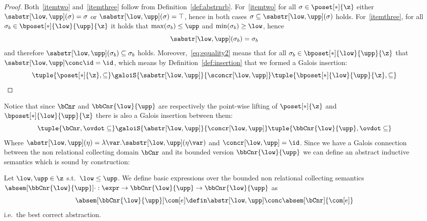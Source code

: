 \begin{proof}
  \noindent
  Both~\ref{itemtwo} and~\ref{itemthree} follow from
  Definition~\ref{def:abstrnrb}. For~\ref{itemtwo} for all
  \(\sigma \in \poset[*]{\z}\) either
  \(\sabstr[\low,\upp]({\sigma}) = \sigma\) or
  \(\sabstr[\low,\upp]({\sigma}) = \top\), hence in both cases
  \(\sigma \subseteq \sabstr[\low,\upp]({\sigma})\)
  holds. For~\ref{itemthree}, for all
  \(\sigma_b \in \bposet[*]{\low}{\upp}{\z}\) it holds that
  \(\max(\sigma_b) \leq \upp\) and \(\min(\sigma_b) \geq \low\), hence
  \begin{equation}\label{eq:equality2}
    \sabstr[\low,\upp]({\sigma_b}) = \sigma_b
  \end{equation}
  and therefore \(\sabstr[\low,\upp]({\sigma_b}) \subseteq \sigma_b\)
  holds.  Moreover,~\eqref{eq:equality2} means that for all
  \(\sigma_b \in \bposet[*]{\low}{\upp}{\z}\) that
  \(\sabstr[\low,\upp] \conc \id = \id\), which means by
  Definition~\ref{def:insertion} that we formed a Galois insertion:
  \begin{equation*}
    \tuple{\poset[*]{\z}, \subseteq}
    \galoiS{\sabstr[\low,\upp]}{\sconcr[\low,\upp]}
    \tuple{\bposet[*]{\low}{\upp}{\z}, \subseteq}
    \qedhere
  \end{equation*}
\end{proof}
Notice that since \(\bCnr\) and \(\bbCnr{\low}{\upp}\) are respectively
the point-wise lifting of \(\poset[*]{\z}\) and
\(\bposet[*]{\low}{\upp}{\z}\) there is also a Galois insertion between
them:
\begin{equation*}
  \tuple{\bCnr, \ovdot\subseteq}
  \galoiS{\abstr[\low,\upp]}{\concr[\low,\upp]}
  \tuple{\bbCnr{\low}{\upp}, \ovdot\subseteq}
\end{equation*}
Where
\(\abstr[\low,\upp](\eta) = \lambda \var . \sabstr[\low,\upp](\eta\var)\)
and \(\concr[\low,\upp] = \id\).  Since we have a Galois connection
between the non relational collecting domain \(\bCnr\) and its bounded
version \(\bbCnr{\low}{\upp}\) we can define an abstract inductive
semantics which is sound by construction:
\begin{definition}
  Let \(\low, \upp \in \z\) s.t.\ \(\low\leq \upp\).  We define basic
  expressions over the bounded non relational collecting semantics
  \({\absem[\bbCnr{\low}{\upp}]{\cdot} : \expr \to \bbCnr{\low}{\upp} \to
    \bbCnr{\low}{\upp}}\) as
  \begin{equation*}
    \absem[\bbCnr{\low}{\upp}]{\com[e]} \defin \abstr[\low,\upp] \conc \absem[\bCnr]{\com[e]}
  \end{equation*}
  i.e.\ the best correct abstraction.
\end{definition}


